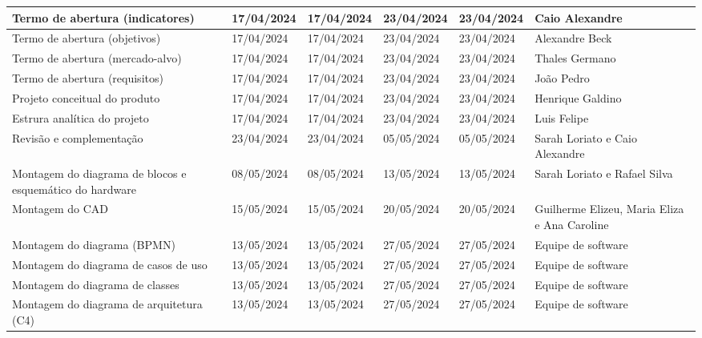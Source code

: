 \begin{xltabular}{\columnwidth}{X|X|X|X|X|X}
  Termo de abertura (indicatores) & 17/04/2024 & 17/04/2024 & 23/04/2024 & 23/04/2024 & Caio Alexandre \\
  \hline

  Termo de abertura (objetivos) & 17/04/2024 & 17/04/2024 & 23/04/2024 & 23/04/2024 & Alexandre Beck \\
  \hline

  Termo de abertura (mercado-alvo) & 17/04/2024 & 17/04/2024 & 23/04/2024 & 23/04/2024 & Thales Germano \\
  \hline

  Termo de abertura (requisitos) & 17/04/2024 & 17/04/2024 & 23/04/2024 & 23/04/2024 & João Pedro \\
  \hline

  Projeto conceitual do produto & 17/04/2024 & 17/04/2024 & 23/04/2024 & 23/04/2024 & Henrique Galdino \\
  \hline

  Estrura analítica do projeto & 17/04/2024 & 17/04/2024 & 23/04/2024 & 23/04/2024 & Luis Felipe \\
  \hline

  Revisão e complementação & 23/04/2024 & 23/04/2024 & 05/05/2024 & 05/05/2024 & Sarah Loriato e Caio Alexandre \\
  \hline

  Montagem do diagrama de blocos e esquemático do hardware & 08/05/2024 & 08/05/2024 & 13/05/2024 & 13/05/2024 & Sarah Loriato e Rafael Silva \\
  \hline

  Montagem do CAD & 15/05/2024 & 15/05/2024 & 20/05/2024 & 20/05/2024 & Guilherme Elizeu, Maria Eliza e Ana Caroline \\
  \hline

  Montagem do diagrama (BPMN) & 13/05/2024 & 13/05/2024 & 27/05/2024 & 27/05/2024 & Equipe de software \\
  \hline

  Montagem do diagrama de casos de uso & 13/05/2024 & 13/05/2024 & 27/05/2024 & 27/05/2024 & Equipe de software \\
  \hline

  Montagem do diagrama de classes & 13/05/2024 & 13/05/2024 & 27/05/2024 & 27/05/2024 & Equipe de software \\
  \hline

  Montagem do diagrama de arquitetura (C4) & 13/05/2024 & 13/05/2024 & 27/05/2024 & 27/05/2024 & Equipe de software \\
  \hline


\end{xltabular}
